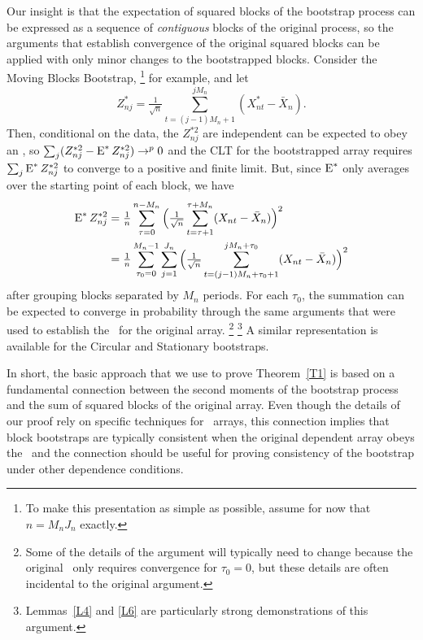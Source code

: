 \documentclass[11pt]{article}
\begin{document}
Our insight is that the expectation of squared blocks of the bootstrap
process can be expressed as a sequence of \emph{contiguous} blocks of
the original process, so the arguments that establish convergence of
the original squared blocks can be applied with only minor changes to
the bootstrapped blocks. Consider the Moving Blocks Bootstrap,%
\footnote{To make this presentation as simple as possible, assume for
  now that $n = M_n J_n$ exactly.} %
for example, and let
\begin{equation*}
  Z_{nj}^* = \tfrac{1}{\sqrt{n}} \sum_{t=(j-1) M_n + 1}^{j M_n} (X_{nt}^* - \bar X_n).
\end{equation*}
Then, conditional on the data, the $Z_{nj}^{*2}$ are independent can
be expected to obey an \lln, so %
$\sum_j (Z_{nj}^{*2} - \operatorname{E}^* Z_{nj}^{*2}) \to^p 0$ %
and the CLT for the bootstrapped array requires $\sum_j \operatorname{E}^*
Z_{nj}^{*2}$ to converge to a positive and finite limit.  But, since
$\operatorname{E}^*$ only averages over the starting point of each block, we have
\begin{align*}
  \operatorname{E}^* Z_{nj}^{*2} &=
  \tfrac{1}{n} \sum_{\tau = 0}^{n-M_n}
  \Big(\tfrac{1}{\sqrt{n}}
  \sum_{t= \tau + 1}^{\tau + M_n} (X_{nt} - \bar X_n) \Big)^2 \\
  &= \tfrac{1}{n} \sum_{\tau_0 = 0}^{M_n-1}
  \sum_{j=1}^{J_n}
  \Big(\tfrac{1}{\sqrt{n}}
  \sum_{t= (j - 1) M_n + \tau_0 + 1}^{j M_n + \tau_0} (X_{nt} - \bar X_n) \Big)^2
\end{align*}
after grouping blocks separated by $M_n$ periods. For each $\tau_0$,
the summation can be expected to converge in probability through the
same arguments that were used to establish the \clt\ for the original
array.%
\footnote{Some of the details of the argument will typically need to
  change because the original \clt\ only requires convergence for
  $\tau_0 = 0$, but these details are often incidental to the original
  argument.}%
\footnote{Lemmas~\ref{L4} and
  \ref{L6} are particularly
  strong demonstrations of this argument.} %
A similar representation is available for the Circular and Stationary
bootstraps.

In short, the basic approach that we use to prove Theorem~\ref{T1}
is based on a fundamental connection between the second moments of the
bootstrap process and the sum of squared blocks of the original
array. Even though the details of our proof rely on specific
techniques for \ned\ arrays, this connection implies that block
bootstraps are typically consistent when the original dependent array
obeys the \clt\ and the connection should be useful for proving
consistency of the bootstrap under other dependence conditions.
\end{document}
